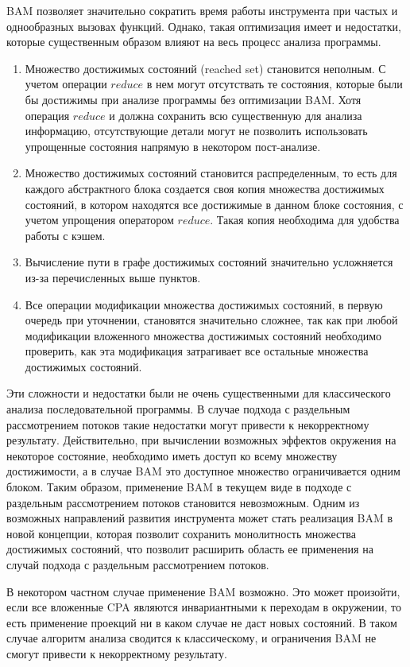 BAM позволяет значительно сократить время работы инструмента при частых и однообразных вызовах функций.
Однако, такая оптимизация имеет и недостатки, которые существенным образом влияют на весь процесс анализа программы.
\begin{enumerate}
\item Множество достижимых состояний (reached set) становится неполным.
С учетом операции $reduce$ в нем могут отсутствать те состояния, которые были бы достижимы при анализе программы без оптимизации BAM.
Хотя операция $reduce$ и должна сохранить всю существенную для анализа информацию, отсутствующие детали могут не позволить использовать упрощенные состояния напрямую в некотором пост-анализе.
\item Множество достижимых состояний становится распределенным, то есть для каждого абстрактного блока создается своя копия множества достижимых состояний, в котором находятся все достижимые в данном блоке состояния, с учетом упрощения оператором $reduce$.
Такая копия необходима для удобства работы с кэшем.
\item Вычисление пути в графе достижимых состояний значительно усложняется из-за перечисленных выше пунктов. 
\item Все операции модификации множества достижимых состояний, в первую очередь при уточнении, становятся значительно сложнее, так как при любой модификации вложенного множества достижимых состояний необходимо проверить, как эта модификация затрагивает все остальные множества достижимых состояний.
\end{enumerate}

Эти сложности и недостатки были не очень существенными для классического анализа последовательной программы.
В случае подхода с раздельным рассмотрением потоков такие недостатки могут привести к некорректному результату.
Действительно, при вычислении возможных эффектов окружения на некоторое состояние, необходимо иметь доступ ко всему множеству достижимости, а в случае BAM это доступное множество ограничивается одним блоком.
Таким образом, применение BAM в текущем виде в подходе с раздельным рассмотрением потоков становится невозможным.
Одним из возможных направлений развития инструмента может стать реализация BAM в новой концепции, которая позволит сохранить монолитность множества достижимых состояний, что позволит расширить область ее применения на случай подхода с раздельным рассмотрением потоков.

В некотором частном случае применение BAM возможно. 
Это может произойти, если все вложенные CPA являются инвариантными к переходам в окружении, то есть применение проекций ни в каком случае не даст новых состояний.
В таком случае алгоритм анализа сводится к классическому, и ограничения BAM не смогут привести к некорректному результату.

